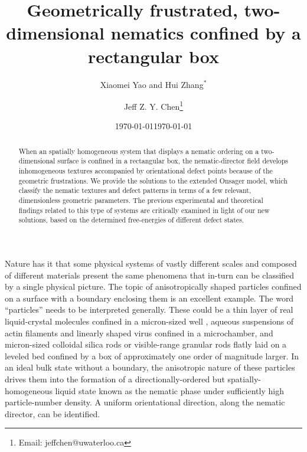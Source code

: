 \documentclass[prl,twocolumn,preprintnumbers,reprint]{revtex4}
\begin{document}

\title{Geometrically frustrated, two-dimensional nematics confined by a rectangular box
}

\author{Xiaomei Yao and Hui Zhang$^*$}
\date{\today}

\author{Jeff Z. Y. Chen\footnote{Email: jeffchen@uwaterloo.ca}}
\date{\today}

\begin{abstract} When an spatially homogeneous system that displays a nematic ordering on a two-dimensional surface is confined in a rectangular box, the nematic-director field develops inhomogeneous textures accompanied by orientational defect points because of the geometric frustrations. We provide the solutions to the extended Onsager model, which classify the nematic textures and defect patterns in terms of a few relevant, dimensionless geometric parameters. The previous experimental and theoretical findings related to this type of systems are critically examined in light of our new solutions, based on the determined free-energies of different defect states.
\end{abstract}

\maketitle

\clearpage
\newpage

Nature has it that some physical systems of vastly different scales and composed of different materials present the same phenomena that in-turn can be classified by a single physical picture. The topic of anisotropically shaped particles confined on a surface with a boundary  enclosing them is an excellent example. The word ``particles'' needs to be interpreted generally. These could be a thin layer of real liquid-crystal molecules confined in a micron-sized well \cite{Tsakonas2007}, aqueous suspensions of actin filaments \cite{Mulder2011} and linearly shaped virus \cite{Lewis2014} confined in a microchamber, and micron-sized colloidal silica rods\cite{Cortes2017} or visible-range granular rods \cite{Galanis2006,Galanis2010} flatly laid on a leveled bed confined by a box of approximately one order of magnitude larger.
In an ideal bulk state without a boundary, the anisotropic nature of these particles drives them into the formation of a directionally-ordered but spatially-homogeneous liquid state known as the nematic phase \cite{deG1993} under sufficiently high particle-number density. A uniform orientational direction, along the nematic director, can be identified.
\end{document}
